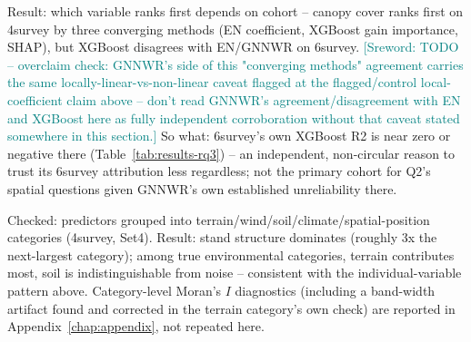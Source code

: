 \documentclass[logo,msc,ai]{infthesis}           %
\newcommand{\sr}[1]{\textcolor{teal}{[Sreword: #1]}}
\begin{document}
Result: which variable ranks first depends on cohort -- canopy cover ranks first
on 4survey by three converging methods (EN coefficient, XGBoost gain importance,
SHAP), but XGBoost disagrees with EN/GNNWR on 6survey.
\sr{TODO -- overclaim check: GNNWR's side of this "converging methods" agreement
carries the same locally-linear-vs-non-linear caveat flagged at the flagged/control
local-coefficient claim above -- don't read GNNWR's agreement/disagreement with
EN and XGBoost here as fully independent corroboration without that caveat stated
somewhere in this section.}
So what: 6survey's own XGBoost R2 is near zero or negative there
(Table~\ref{tab:results-rq3}) -- an independent, non-circular reason to trust its
6survey attribution less regardless; not the primary cohort for Q2's spatial
questions given GNNWR's own established unreliability there.

Checked: predictors grouped into terrain/wind/soil/climate/spatial-position
categories (4survey, Set4). Result: stand structure dominates (roughly 3x the
next-largest category); among true environmental categories, terrain contributes
most, soil is indistinguishable from noise -- consistent with the
individual-variable pattern above. Category-level Moran's $I$ diagnostics
(including a band-width artifact found and corrected in the terrain category's
own check) are reported in Appendix~\ref{chap:appendix}, not repeated here.
\end{document}
